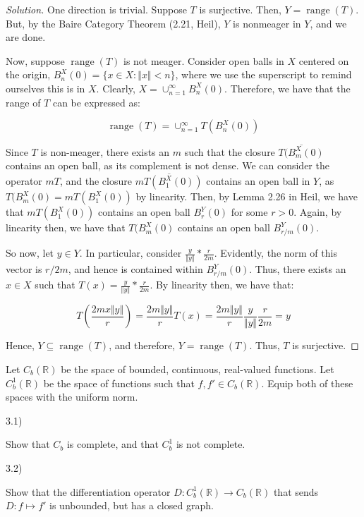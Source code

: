 \documentclass[10pt]{article}
\newenvironment{problem}[2][]{\begin{trivlist}
\item[\hskip \labelsep {\bfseries #1}\hskip \labelsep {\bfseries #2.}]}{\end{trivlist}}
\begin{document}
\begin{proof}[Solution]

One direction is trivial. Suppose $T$ is surjective. Then, $Y = \operatorname{range}(T)$. But, by the Baire Category Theorem (2.21, Heil), $Y$ is nonmeager in $Y$, and we are done.

Now, suppose $\operatorname{range}(T)$ is not meager. Consider open balls in $X$ centered on the origin, $B_n^X(0) = \{ x \in X : \Vert x \Vert < n \}$, where we use the superscript to remind ourselves this is in $X$. Clearly, $X = \cup_{n=1}^\infty B_n^X(0)$. Therefore, we have that the range of $T$ can be expressed as:

$$ \operatorname{range}(T) = \cup_{n=1}^\infty T(B_n^X(0)) $$

Since $T$ is non-meager, there exists an $m$ such that the closure $\overline{T(B_m^X(0)}$ contains an open ball, as its complement is not dense. We can consider the operator $mT$, and the closure $\overline{mT(B_1^X(0))}$ contains an open ball in $Y$, as $T(B_m^X(0) = mT(B_1^X(0))$ by linearity. Then, by Lemma 2.26 in Heil, we have that $mT(B_1^X(0))$ contains an open ball $B_r^Y(0)$ for some $r > 0$. Again, by linearity then, we have that $T(B_m^X(0)$ contains an open ball $B_{r/m}^Y(0)$.

So now, let $y \in Y$. In particular, consider $\frac{y}{\Vert y \Vert} * \frac{r}{2m}$. Evidently, the norm of this vector is $r/2m$, and hence is contained within $B_{r/m}^Y(0)$. Thus, there exists an $x \in X$ such that $T(x) = \frac{y}{\Vert y \Vert} * \frac{r}{2m}$. By linearity then, we have that:

$$T\left( \frac{2mx \Vert y \Vert}{r} \right) = \frac{2m\Vert y \Vert}{r} T(x) =  \frac{2m\Vert y \Vert}{r} \frac{y}{\Vert y \Vert}  \frac{r}{2m} = y$$

Hence, $Y \subseteq \operatorname{range}(T)$, and therefore, $Y = \operatorname{range}(T)$. Thus, $T$ is surjective. 

\end{proof}
\pagebreak
\begin{problem}{Question 3}

Let $C_b(\mathbb{R})$ be the space of bounded, continuous, real-valued functions. Let $C^1_b(\mathbb{R})$ be the space of functions such that $f, f' \in C_b(\mathbb{R})$. Equip both of these spaces with the uniform norm.

3.1)

Show that $C_b$ is complete, and that $C^1_b$ is not complete.

3.2)

Show that the differentiation operator $D: C^1_b(\mathbb{R}) \to C_b(\mathbb{R})$ that sends $D: f \mapsto f'$ is unbounded, but has a closed graph.

\end{problem}
\end{document}
